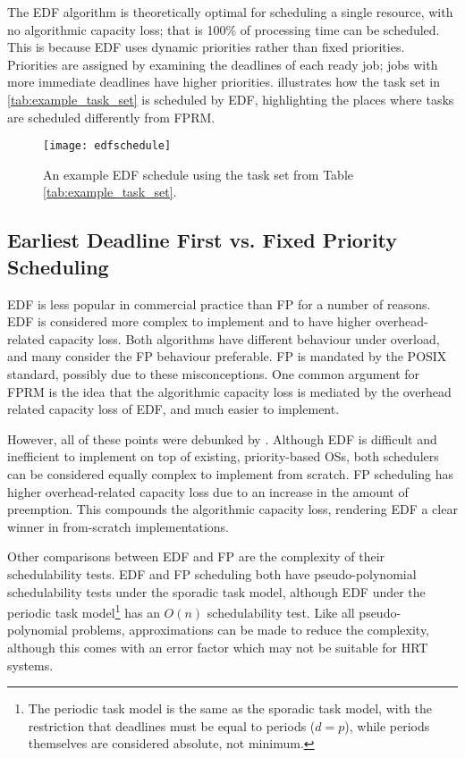 The \gls{EDF} algorithm is theoretically optimal for scheduling a single resource, with no
algorithmic capacity loss; that is 100\% of processing time can be scheduled. This is because
\gls{EDF} uses dynamic priorities rather than fixed priorities. 
Priorities are assigned by examining the deadlines of each ready job; jobs with more immediate deadlines have higher priorities.
 illustrates how the task set in \cref{tab:example_task_set} is scheduled by
\gls{EDF}, highlighting the places where tasks are scheduled differently from FPRM.

\begin{figure}[h!tb]
	\begin{center}
		\leavevmode
		\texttt{[image: edfschedule]}
		\caption{An example EDF schedule using the task set from Table \ref{tab:example_task_set}.}
		\label{f:edf-schedule}
	\end{center}
\end{figure}

\subsection{Earliest Deadline First vs. Fixed Priority Scheduling}
\label{s:overload}

\gls{EDF} is less popular in commercial practice than \gls{FP} for a number of reasons.  \gls{EDF}
is considered more complex to implement and to have higher overhead-related capacity loss.
Both algorithms have different behaviour under overload, and many consider the \gls{FP} behaviour
preferable. \gls{FP}
is mandated by the POSIX standard, possibly due to these misconceptions. One common argument for
\gls{FPRM} is the idea that the algorithmic capacity loss is mediated by the overhead related
capacity loss of \gls{EDF}, and much easier to implement. 

However, all of these points were debunked by \citet{Buttazzo_05}.  Although \gls{EDF} is difficult
and inefficient to implement on top of existing, priority-based \glspl{OS}, both schedulers
can be considered equally complex to implement from scratch.  \gls{FP} scheduling has higher
overhead-related capacity loss due to an increase in the amount of preemption.  This compounds the
algorithmic capacity loss, rendering \gls{EDF} a clear winner in from-scratch implementations.

Other comparisons between \gls{EDF} and \gls{FP} are the complexity of their schedulability tests.
\gls{EDF} and \gls{FP} scheduling both have pseudo-polynomial
schedulability tests under the sporadic task model, although \gls{EDF} under the periodic task
model\footnote{The periodic task model is the same as the sporadic task model, with the restriction
that deadlines must be equal to periods ($d = p$), while periods themselves are considered absolute,
not minimum.} has an $O(n)$ schedulability test.  Like all pseudo-polynomial problems,
approximations can be made to reduce the complexity, although this comes with an error factor which
may not be suitable for \gls{HRT} systems.  

